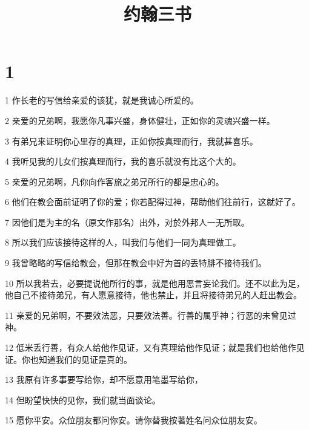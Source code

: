 

\title{约翰三书}


\chapter{1}

\par 1 作长老的写信给亲爱的该犹，就是我诚心所爱的。
\par 2 亲爱的兄弟啊，我愿你凡事兴盛，身体健壮，正如你的灵魂兴盛一样。
\par 3 有弟兄来证明你心里存的真理，正如你按真理而行，我就甚喜乐。
\par 4 我听见我的儿女们按真理而行，我的喜乐就没有比这个大的。
\par 5 亲爱的兄弟啊，凡你向作客旅之弟兄所行的都是忠心的。
\par 6 他们在教会面前证明了你的爱；你若配得过神，帮助他们往前行，这就好了。
\par 7 因他们是为主的名（原文作那名）出外，对於外邦人一无所取。
\par 8 所以我们应该接待这样的人，叫我们与他们一同为真理做工。
\par 9 我曾略略的写信给教会，但那在教会中好为首的丢特腓不接待我们。
\par 10 所以我若去，必要提说他所行的事，就是他用恶言妄论我们。还不以此为足，他自己不接待弟兄，有人愿意接待，他也禁止，并且将接待弟兄的人赶出教会。
\par 11 亲爱的兄弟啊，不要效法恶，只要效法善。行善的属乎神；行恶的未曾见过神。
\par 12 低米丢行善，有众人给他作见证，又有真理给他作见证；就是我们也给他作见证。你也知道我们的见证是真的。
\par 13 我原有许多事要写给你，却不愿意用笔墨写给你，
\par 14 但盼望快快的见你，我们就当面谈论。
\par 15 愿你平安。众位朋友都问你安。请你替我按著姓名问众位朋友安。



